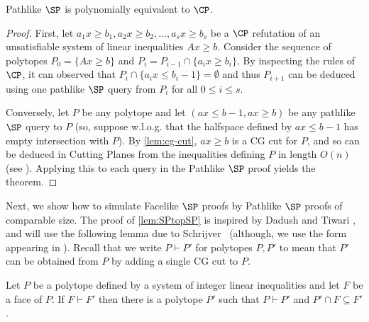\begin{theorem}\label{lem:pathsp-cp}
	 Pathlike $\SP$ is polynomially equivalent to $\CP$. 	
\end{theorem}
\begin{proof}
	First, let $a_1x \geq b_1, a_2x \geq b_2, \ldots, a_sx \geq b_s$ be a $\CP$ refutation of an unsatisfiable system of linear inequalities $Ax \geq b$. 
	Consider the sequence of polytopes $P_0 =\{Ax \geq b\}$ and $P_i = P_{i-1} \cap \{a_i x \geq b_i\}$. 
	By inspecting the rules of $\CP$, it can observed that $P_i \cap \{a_ix \leq b_i-1\}= \emptyset$ and thus $P_{i+1}$ can be deduced using one pathlike $\SP$ query from $P_i$ for all $0 \leq i \leq s$.
	
	Conversely, let $P$ be any polytope and let $(ax \leq b-1, ax \geq b)$ be any pathlike $\SP$ query to $P$ (so, suppose w.l.o.g. that the halfspace defined by $ax \leq b-1$ has empty intersection with $P$).
	By \autoref{lem:cg-cut}, $ax \geq b$ is a CG cut for $P$, and so can be deduced in Cutting Planes from the inequalities defining $P$ in length $O(n)$
%
(see ).    %
	Applying this to each query in the Pathlike $\SP$ proof yields the theorem.
%
%
%
%
%
%
\end{proof}
	Next, we show how to simulate Facelike $\SP$ proofs by Pathlike $\SP$ proofs of comparable size.
	The proof of \autoref{lem:SPtopSP} is inspired by Dadush and Tiwari \cite{TseitinUpperBound}, and will use the following lemma due to Schrijver~\cite{SCHRIJVER1980291} (although, we use the form appearing in \cite{CookCT87}).
	Recall that we write $P \vdash P'$ for polytopes $P, P'$ to mean that $P'$ can be obtained from $P$ by adding a single CG cut to $P$.
	\begin{theorem}
	\label{lem:shrijver}
		Let $P$ be a polytope defined by a system of integer linear inequalities and let $F$ be a face of $P$. 
		If $F \vdash F'$ then there is a polytope $P'$ such that $P \vdash P'$ and $P' \cap F \subseteq F'$.
	\end{theorem}
	
